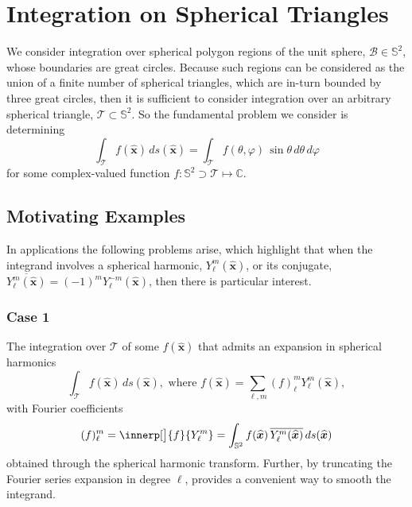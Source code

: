 \documentclass[10pt, twocolumn, twoside]{IEEEtran}
\newcommand{\untsph}{\mathbb{S}^{2}} %
\newcommand{\unit}[1]{\widehat{\bm{#1}}}
\newcommand{\conj}[1]{\overline{#1}} %
\begin{document}
\clearpage

\newcommand{\T}{\mathscr{T}\!}
\newcommand{\proj}{\mathscr{B}}


\section{Integration on Spherical Triangles}
\begin{bibunit}

We consider integration over spherical polygon regions of the unit sphere, $\proj\in\untsph$, whose boundaries are great circles.  Because such regions can be considered as the union of a finite number of spherical triangles, which are in-turn bounded by three great circles, then it is sufficient to consider integration over an arbitrary spherical triangle, $\T\subset\untsph$.  So the fundamental problem we consider is determining
\[
\int_{\T} f(\unit{x})\,ds(\unit{x})
= \int_{\T} f(\theta,\varphi)\,\sin\theta\,d\theta\,d\varphi
\]
for some complex-valued function $f\colon \untsph\supset\T\mapsto\mathbb{C}$.

\subsection{Motivating Examples}

In applications the following problems arise, which highlight that when the integrand involves a spherical harmonic, $Y_{\ell}^{m}(\unit{x})$, or its conjugate, $\conj{Y_{\ell}^{m}(\unit{x})}=(-1)^{m}Y_{\ell}^{-m}(\unit{x})$, then there is particular interest.

\subsubsection{Case 1} The integration over $\T$ of some $f(\unit{x})$ that admits an expansion in spherical harmonics
\begin{equation}
\label{eqn:prob1}
\int_{\T} f(\unit{x})\,ds(\unit{x}), \text{~where~}
f(\unit{x}) = \sum_{\ell,m} (f)_{\ell}^{m} Y_{\ell}^{m}(\unit{x}),
\end{equation}
with Fourier coefficients
\[
(f)_{\ell}^{m}=\innerp[\big]{f}{Y_{\ell}^{m}}
=\int_{\untsph} f(\unit{x})\,\conj{Y_{\ell}^{m}(\unit{x})}\,ds(\unit{x})
\]
obtained through the spherical harmonic transform.  Further, by truncating the Fourier series expansion in degree $\ell$, provides a convenient way to smooth the integrand.


\end{bibunit}
\end{document}
